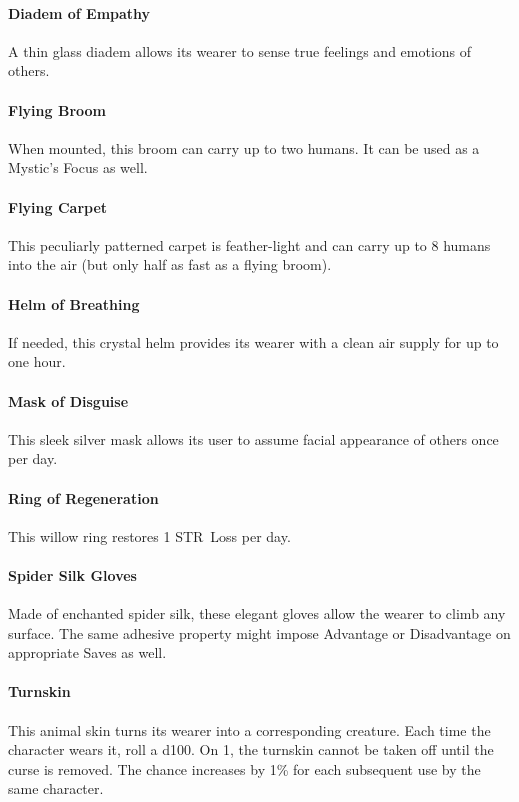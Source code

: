 \documentclass[itdr]{subfiles}
\begin{document}
\vfill
\paragraph{Diadem of Empathy}
A thin glass diadem allows its wearer to sense true feelings and emotions of others.

\vfill
\paragraph{Flying Broom}
When mounted, this broom can carry up to two \mbox{humans}. It can be used as a Mystic's Focus as well.

\vfill
\paragraph{Flying Carpet}
This peculiarly patterned carpet is feather-light and can carry up to 8 humans into the air (but only half as fast as a flying broom).

\vfill
\paragraph{Helm of Breathing}
If needed, this crystal helm provides its wearer with a clean air supply  for up to one hour.

\vfill
\paragraph{Mask of Disguise}
This sleek silver mask allows its user to assume \mbox{facial} appearance of others once per day.

\vfill
\paragraph{Ring of Regeneration}
This willow ring restores 1 STR~Loss per day.

\vfill
\paragraph{Spider Silk Gloves}
Made of enchanted spider silk, these elegant gloves allow the wearer to climb any surface. The same adhesive property might impose Advantage or Disadvantage on appropriate Saves as well.

\vfill
\paragraph{Turnskin}
This animal skin turns its wearer into a corresponding creature. Each time the character wears it, roll a d100. On 1, the turnskin cannot be taken off until the curse is removed. The chance increases by 1\% for each subsequent use by the same character.
\end{document}
